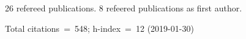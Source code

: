26 refereed publications. 8 refeered publications as first author.

Total citations~=~548; h-index~=~12 (2019-01-30)